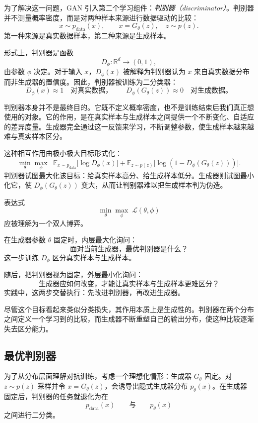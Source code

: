 为了解决这一问题，GAN 引入第二个学习组件：\emph{判别器（discriminator）}。判别器并不测量概率密度，而是对两种样本来源进行数据驱动的比较：
\[
x\sim p_{\text{data}}(x),
\qquad
x=G_\theta(z),\quad z\sim p(z).
\]
第一种来源是真实数据样本，第二种来源是生成样本。

形式上，判别器是函数
\[
D_\phi:\mathbb{R}^d\to(0,1),
\]
由参数 $\phi$ 决定。对于输入 $x$，$D_\phi(x)$ 被解释为判别器认为 $x$ 来自真实数据分布而非生成器的置信度。因此，判别器被训练为二分类器：
\[
D_\phi(x)\approx 1
\quad\text{对真实数据，}
\qquad
D_\phi(G_\theta(z))\approx 0
\quad\text{对生成数据。}
\]

判别器本身并不是最终目的。它既不定义概率密度，也不是训练结束后我们真正想使用的对象。它的作用，是在真实样本与生成样本之间提供一个不断变化、自适应的差异度量。生成器完全通过这一反馈来学习，不断调整参数，使生成样本越来越难与真实样本区分。

这种相互作用由极小极大目标形式化：
\[
\boxed{
\min_\theta \max_\phi
\;\;
\mathbb{E}_{x \sim p_{\text{data}}}
\big[\log D_\phi(x)\big]
+
\mathbb{E}_{z \sim p(z)}
\big[\log (1 - D_\phi(G_\theta(z)))\big].
}
\]
判别器试图最大化该目标：给真实样本高分、给生成样本低分。生成器则试图最小化它，使 $D_\phi(G_\theta(z))$ 变大，从而让判别器难以把生成样本判为伪造。

\begin{tcolorbox}[
  colback=blue!4,
  colframe=blue!50!black,
  title={如何理解极小极大目标},
  boxrule=0.6pt,
  arc=2mm,
  left=2mm,
  right=2mm,
  top=1mm,
  bottom=1mm
]
表达式
\[
\min_\theta \max_\phi \; \mathcal{L}(\theta,\phi)
\]
应被理解为一个双人博弈。

在生成器参数 $\theta$ 固定时，内层最大化询问：
\[
\textit{面对当前生成器，最优判别器是什么？}
\]
这一步训练 $D_\phi$ 区分真实样本与生成样本。

随后，把判别器视为固定，外层最小化询问：
\[
\textit{生成器应如何改变，才能让真实样本与生成样本更难区分？}
\]
实践中，这两步交替执行：先改进判别器，再改进生成器。
\end{tcolorbox}

尽管这个目标看起来类似分类损失，其作用本质上是生成性的。判别器在两个分布之间定义一个学习到的比较，而生成器不断重塑自己的输出分布，使这种比较逐渐失去区分能力。

\subsection{最优判别器}

为了从分布层面理解对抗训练，考虑一个理想化情形：生成器 $G_\theta$ 固定。对 $z\sim p(z)$ 采样并令 $x=G_\theta(z)$，会诱导出隐式生成器分布 $p_\theta(x)$。在生成器固定后，判别器的任务就退化为在
\[
p_{\text{data}}(x)
\qquad\text{与}\qquad
p_\theta(x)
\]
之间进行二分类。

